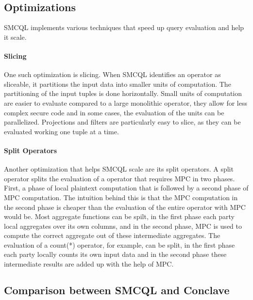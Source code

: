 \label{sec:Optimizations_smcql}
\subsection{Optimizations}
SMCQL implements various techniques that speed up query evaluation and help it scale. 
\paragraph{Slicing}
One such optimization is slicing. When SMCQL identifies an operator as sliceable, it partitions the input data into smaller units of computation. The partitioning of the input tuples is done horizontally. Small units of computation are easier to evaluate compared to a large monolithic operator, they allow for less complex secure code and in some cases, the evaluation of the units can be parallelized. Projections and filters are particularly easy to slice, as they can be evaluated working one tuple at a time.
\paragraph{Split Operators} %
Another optimization that helps SMCQL scale are its split operators. A split operator splits the evaluation of a operator that requires MPC in two phases. First, a phase of local plaintext computation that is followed by a second phase of MPC computation. The intuition behind this is that the MPC computation in the second phase is cheaper than the evaluation of the entire operator with MPC would be. Most aggregate functions can be spilt, in the first phase each party local aggregates over its own columns, and in the second phase, MPC is used to compute the correct aggregate out of these intermediate aggregates. The evaluation of a count(*) operator, for example, can be split, in the first phase each party locally counts its own input data and in the second phase these intermediate results are added up with the help of MPC. %

\subsection{Comparison between SMCQL and Conclave}

